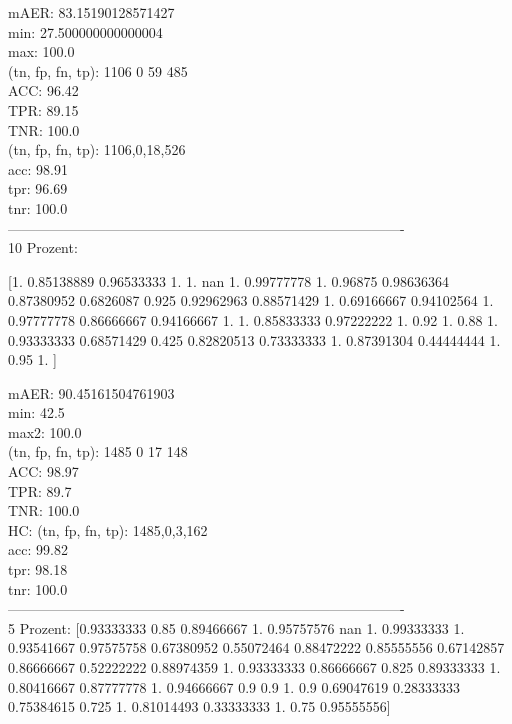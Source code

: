 \documentclass[11pt,a4paper]{article}
\numberwithin{equation}{section}
\begin{document}
	mAER:  83.15190128571427\\
	min:  27.500000000000004\\
	max:  100.0\\
	 
	(tn, fp, fn, tp):  1106 0 59 485\\
	ACC: 96.42\\
	TPR:  89.15\\
	TNR:  100.0\\
	
	(tn, fp, fn, tp): 1106,0,18,526\\
	acc: 98.91\\
	tpr: 96.69\\
	tnr: 100.0\\
	-------------------------------------------------------------------------------------\\
	10 Prozent:
	
	[1.         0.85138889 0.96533333 1.         1.                nan
	1.         0.99777778 1.         0.96875    0.98636364 0.87380952
	0.6826087  0.925      0.92962963 0.88571429 1.         0.69166667
	0.94102564 1.         0.97777778 0.86666667 0.94166667 1.
	1.         0.85833333 0.97222222 1.         0.92       1.
	0.88       1.         0.93333333 0.68571429 0.425      0.82820513
	0.73333333 1.         0.87391304 0.44444444 1.         0.95
	1.        ]
	
	
	mAER:  90.45161504761903\\
	min:  42.5\\
	max2:  100.0\\
	
	(tn, fp, fn, tp):  1485 0 17 148\\
	ACC: 98.97\\
	TPR:  89.7\\
	TNR:  100.0\\
	
	HC: (tn, fp, fn, tp): 1485,0,3,162\\
	acc: 99.82\\
	tpr: 98.18\\
	tnr: 100.0\\
	
	-------------------------------------------------------------------------------------\\
	5 Prozent:
	[0.93333333 0.85       0.89466667 1.         0.95757576        nan
	1.         0.99333333 1.         0.93541667 0.97575758 0.67380952
	0.55072464 0.88472222 0.85555556 0.67142857 0.86666667 0.52222222
	0.88974359 1.         0.93333333 0.86666667 0.825      0.89333333
	1.         0.80416667 0.87777778 1.         0.94666667 0.9
	0.9        1.         0.9        0.69047619 0.28333333 0.75384615
	0.725      1.         0.81014493 0.33333333 1.         0.75
	0.95555556]
	
\end{document}
